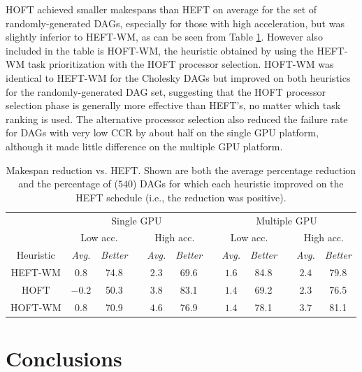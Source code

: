 \documentclass[runningheads]{llncs}
\begin{document}
HOFT achieved smaller makespans than HEFT on average for the set of randomly-generated DAGs, especially for those with high acceleration, but was slightly inferior to HEFT-WM, as can be seen from Table \ref{tb.hoft_random_DAGs}. However also included in the table is HOFT-WM, the heuristic obtained by using the HEFT-WM task prioritization with the HOFT processor selection. HOFT-WM was identical to HEFT-WM for the Cholesky DAGs but improved on both heuristics for the randomly-generated DAG set, suggesting that the HOFT processor selection phase is generally more effective than HEFT's, no matter which task ranking is used. The alternative processor selection also reduced the failure rate for DAGs with very low CCR by about half on the single GPU platform, although it made little difference on the multiple GPU platform.

\begin{table}
	\caption{Makespan reduction vs. HEFT. Shown are both the average percentage reduction and the percentage of ($540$) DAGs for which each heuristic improved on the HEFT schedule (i.e., the reduction was positive).} 
	\begin{center}	
		\begin{tabular}{c c c c c c c c c c c c}
			\toprule
			& \multicolumn{5}{c}{Single GPU} && \multicolumn{5}{c}{Multiple GPU}\\
			\cmidrule{2-6} \cmidrule{8-12}
			& \multicolumn{2}{c}{Low acc.} && \multicolumn{2}{c}{High acc.} && \multicolumn{2}{c}{Low acc.} && \multicolumn{2}{c}{High acc.}\\
			\cmidrule{2-3} \cmidrule{5-6} \cmidrule{8-9} \cmidrule{11-12}
			Heuristic & {\em Avg.} & {\em Better} && {\em Avg.} & {\em Better} && {\em Avg.} & {\em Better} && {\em Avg.} & {\em Better}\\
			\cmidrule{1-12}
			HEFT-WM & $0.8$ & 74.8 && $2.3$ & 69.6 && $1.6$ & 84.8 && $2.4$ & 79.8\\
			HOFT & $-0.2$ & 50.3 && $3.8$ & 83.1 && $1.4$ & 69.2 && $2.3$ & 76.5\\
			HOFT-WM & $0.8$ & 70.9 && $4.6$ & 76.9 && $1.4$ & 78.1 && $3.7$ & 81.1\\ 
			\bottomrule			
		\end{tabular}
		\label{tb.hoft_random_DAGs}
	\end{center}	
\end{table}


\section{Conclusions}
\label{sect.conclusion}
\end{document}
